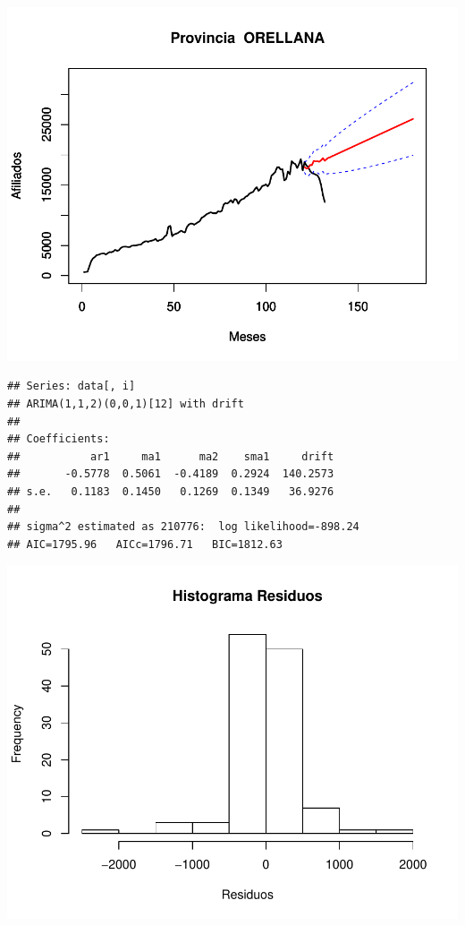 \documentclass[11pt,a4paper,oneside]{article}\usepackage[]{graphicx}\usepackage[]{color}
\makeatletter
\def\maxwidth{ %
  \ifdim\Gin@nat@width>\linewidth
    \linewidth
  \else
    \Gin@nat@width
  \fi
}
\newenvironment{kframe}{%
 \def\at@end@of@kframe{}%
 \ifinner\ifhmode%
  \def\at@end@of@kframe{\end{minipage}}%
  \begin{minipage}{\columnwidth}%
 \fi\fi%
 \def\FrameCommand##1{\hskip\@totalleftmargin \hskip-\fboxsep
 \colorbox{shadecolor}{##1}\hskip-\fboxsep
     \hskip-\linewidth \hskip-\@totalleftmargin \hskip\columnwidth}%
 \MakeFramed {\advance\hsize-\width
   \@totalleftmargin\z@ \linewidth\hsize
   \@setminipage}}%
 {\par\unskip\endMakeFramed%
 \at@end@of@kframe}
\newenvironment{knitrout}{}{} %
\makeatother
\begin{document}
\begin{knitrout}
{\centering \includegraphics[width=\maxwidth]{figure/unnamed-chunk-16-49} 

}


\begin{kframe}\begin{verbatim}
## Series: data[, i] 
## ARIMA(1,1,2)(0,0,1)[12] with drift         
## 
## Coefficients:
##           ar1     ma1      ma2    sma1     drift
##       -0.5778  0.5061  -0.4189  0.2924  140.2573
## s.e.   0.1183  0.1450   0.1269  0.1349   36.9276
## 
## sigma^2 estimated as 210776:  log likelihood=-898.24
## AIC=1795.96   AICc=1796.71   BIC=1812.63
\end{verbatim}
\end{kframe}

{\centering \includegraphics[width=\maxwidth]{figure/unnamed-chunk-16-50} 

}
\end{knitrout}
\end{document}
